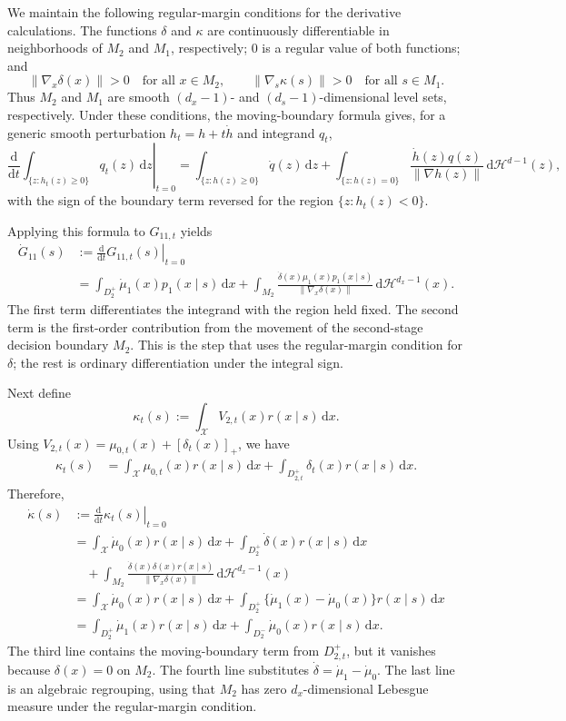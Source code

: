 \documentclass[12pt]{article}
\newcommand{\1}{\mathbf{1}}
\begin{document}
We maintain the following regular-margin conditions for the derivative
calculations. The functions $\delta$ and $\kappa$ are continuously
differentiable in neighborhoods of $M_2$ and $M_1$, respectively; $0$ is a
regular value of both functions; and
\[
\lVert\nabla_x\delta(x)\rVert>0
\quad\text{for all }x\in M_2,
\qquad
\lVert\nabla_s\kappa(s)\rVert>0
\quad\text{for all }s\in M_1.
\]
Thus $M_2$ and $M_1$ are smooth $(d_x-1)$- and $(d_s-1)$-dimensional level
sets, respectively. Under these conditions, the moving-boundary formula gives,
for a generic smooth perturbation $h_t=h+t\dot h$ and integrand $q_t$,
\[
\left.
\frac{\mathrm d}{\mathrm dt}
\int_{\{z:h_t(z)\geq 0\}}q_t(z)\,\mathrm dz
\right|_{t=0}
=
\int_{\{z:h(z)\geq 0\}}\dot q(z)\,\mathrm dz
+
\int_{\{z:h(z)=0\}}
\frac{\dot h(z)q(z)}
{\lVert\nabla h(z)\rVert}
\,\mathrm d\mathcal H^{d-1}(z),
\]
with the sign of the boundary term reversed for the region $\{z:h_t(z)<0\}$.

Applying this formula to $G_{11,t}$ yields
\begin{align*}
\dot G_{11}(s)
&:=
\left.\frac{\mathrm d}{\mathrm dt}G_{11,t}(s)\right|_{t=0} \\
&=
\int_{D_2^+}\dot\mu_1(x)p_1(x\mid s)\,\mathrm dx
+
\int_{M_2}
\frac{\dot\delta(x)\mu_1(x)p_1(x\mid s)}
{\lVert\nabla_x\delta(x)\rVert}
\,\mathrm d\mathcal H^{d_x-1}(x).
\end{align*}
The first term differentiates the integrand with the region held fixed. The
second term is the first-order contribution from the movement of the
second-stage decision boundary $M_2$. This is the step that uses the
regular-margin condition for $\delta$; the rest is ordinary differentiation
under the integral sign.

Next define
\[
\kappa_t(s)
:=
\int_{\mathcal X}V_{2,t}(x)r(x\mid s)\,\mathrm dx.
\]
Using $V_{2,t}(x)=\mu_{0,t}(x)+[\delta_t(x)]_+$, we have
\begin{align*}
\kappa_t(s)
&=
\int_{\mathcal X}\mu_{0,t}(x)r(x\mid s)\,\mathrm dx
+
\int_{D_{2,t}^+}\delta_t(x)r(x\mid s)\,\mathrm dx.
\end{align*}
Therefore,
\begin{align*}
\dot\kappa(s)
&:=
\left.\frac{\mathrm d}{\mathrm dt}\kappa_t(s)\right|_{t=0} \\
&=
\int_{\mathcal X}\dot\mu_0(x)r(x\mid s)\,\mathrm dx
+
\int_{D_2^+}\dot\delta(x)r(x\mid s)\,\mathrm dx \\
&\quad+
\int_{M_2}
\frac{\dot\delta(x)\delta(x)r(x\mid s)}
{\lVert\nabla_x\delta(x)\rVert}
\,\mathrm d\mathcal H^{d_x-1}(x) \\
&=
\int_{\mathcal X}\dot\mu_0(x)r(x\mid s)\,\mathrm dx
+
\int_{D_2^+}\{\dot\mu_1(x)-\dot\mu_0(x)\}r(x\mid s)\,\mathrm dx \\
&=
\int_{D_2^+}\dot\mu_1(x)r(x\mid s)\,\mathrm dx
+
\int_{D_2^-}\dot\mu_0(x)r(x\mid s)\,\mathrm dx.
\end{align*}
The third line contains the moving-boundary term from $D_{2,t}^+$, but it
vanishes because $\delta(x)=0$ on $M_2$. The fourth line substitutes
$\dot\delta=\dot\mu_1-\dot\mu_0$. The last line is an algebraic regrouping,
using that $M_2$ has zero $d_x$-dimensional Lebesgue measure under the
regular-margin condition.
\end{document}
